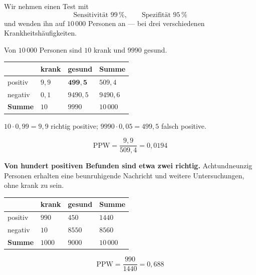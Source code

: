 \begin{merksatz}
Wir nehmen einen Test mit
\[ \text{Sensitivität } 99\,\% , \qquad \text{Spezifität } 95\,\% \]
und wenden ihn auf $10\,000$ Personen an --- bei drei verschiedenen Krankheitshäufigkeiten.

Von $10\,000$ Personen sind $10$ krank und $9990$ gesund.

\begin{center}
\renewcommand{\arraystretch}{1.5}
\begin{tabular}{@{}P{2.2cm}P{2.0cm}P{2.4cm}P{1.8cm}@{}}
\toprule
& \textbf{krank} & \textbf{gesund} & \textbf{Summe}\\
\midrule
positiv & $9{,}9$ & \textcolor{akzent}{$\mathbf{499{,}5}$} & $509{,}4$\\
negativ & $0{,}1$ & $9490{,}5$ & $9490{,}6$\\
\midrule
\textbf{Summe} & $10$ & $9990$ & $10\,000$\\
\bottomrule
\end{tabular}
\end{center}

 $10 \cdot 0{,}99 = 9{,}9$ richtig positive; $9990 \cdot 0{,}05 = 499{,}5$ falsch positive.

\[ \mathrm{PPW} = \frac{9{,}9}{509{,}4} = 0{,}0194 \]

\begin{center}
\begin{minipage}{0.9\textwidth}
\textbf{Von hundert positiven Befunden sind etwa zwei richtig.} Achtundneunzig Personen erhalten eine beunruhigende Nachricht und weitere Untersuchungen, ohne krank zu sein.
\end{minipage}
\end{center}

\begin{center}
\renewcommand{\arraystretch}{1.5}
\begin{tabular}{@{}P{2.2cm}P{2.0cm}P{2.0cm}P{1.8cm}@{}}
\toprule
& \textbf{krank} & \textbf{gesund} & \textbf{Summe}\\
\midrule
positiv & $990$ & $450$ & $1440$\\
negativ & $10$ & $8550$ & $8560$\\
\midrule
\textbf{Summe} & $1000$ & $9000$ & $10\,000$\\
\bottomrule
\end{tabular}
\end{center}
\[ \mathrm{PPW} = \frac{990}{1440} = 0{,}688 \]


\end{merksatz}
